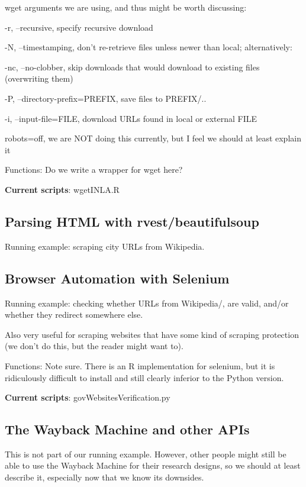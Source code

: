 \documentclass[11pt]{article}
\begin{document}
wget arguments we are using, and thus might be worth discussing:

-r, --recursive, specify recursive download

-N, --timestamping, don't re-retrieve files unless newer than local; alternatively:

-nc, --no-clobber, skip downloads that would download to existing files (overwriting them)

-P,  --directory-prefix=PREFIX, save files to PREFIX/..

-i, --input-file=FILE, download URLs found in local or external FILE

robots=off, we are NOT doing this currently, but I feel we should at least explain it

Functions: Do we write a wrapper for wget here?

\textbf{Current scripts}: wgetINLA.R

\subsection{Parsing HTML with rvest/beautifulsoup} \label{htmlparsing}

Running example: scraping city URLs from Wikipedia.

\subsection{Browser Automation with Selenium} \label{selenium}

Running example: checking whether URLs from Wikipedia/, are valid, and/or whether they redirect somewhere else.

Also very useful for scraping websites that have some kind of scraping protection (we don't do this, but the reader might want to).

Functions: Note sure. There is an R implementation for selenium, but it is ridiculously difficult to install and still clearly inferior to the Python version.

\textbf{Current scripts}: govWebsitesVerification.py

\subsection{The Wayback Machine and other APIs}

This is not part of our running example. However, other people might still be able to use the Wayback Machine for their research designs, so we should at least describe it, especially now that we know its downsides.
\end{document}
